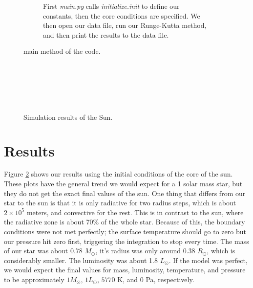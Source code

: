 \documentclass[10pt]{article}
\begin{document}
\begin{figure}[htbp]

 \begin{subfigure}{\textwidth}
  
  
  
  
  \caption{First \emph{main.py} calls \emph{initialize.init} to define our constants, then the core conditions are specified. We then open our data file, run our Runge-Kutta method, and then print the results to the data file.}
 \end{subfigure}
 \caption{main method of the code.}
 \label{fig:code}
\end{figure}

\begin{figure}[p]
\begin{centering}
 \begin{subfigure}{\textwidth}
  
 \end{subfigure} \\
 \begin{subfigure}{\textwidth}
  
 \end{subfigure} \\
  \begin{subfigure}{\textwidth}
  
 \end{subfigure} \\
   \begin{subfigure}{\textwidth}
  
 \end{subfigure}
 \caption{Simulation results of the Sun.}
 \label{fig:sun}
 \end{centering}
\end{figure}

\section{Results}
Figure \ref{fig:sun} shows our results using the initial conditions of the core of the sun. These plots have the general trend we would expect for a 1 solar mass star, but they do not get the exact final values of the sun. One thing that differs from our star to the sun is that it is only radiative for two radius steps, which is about $2\times 10^5$ meters, and convective for the rest. This is in contrast to the sun, where the radiative zone is about 70\% of the whole star. Because of this, the boundary conditions were not met perfectly; the surface temperature should go to zero but our pressure hit zero first, triggering the integration to stop every time. The mass of our star was about 0.78 $M_\odot$, it's radius was only around 0.38 $R_\odot$, which is considerably smaller. The luminosity was about 1.8 $ L_\odot$. If the model was perfect, we would expect the final values for mass, luminosity, temperature, and pressure to be approximately $1 M_\odot$, $1 L_\odot$, $5770$ K, and $0$ Pa, respectively. \\
\end{document}
